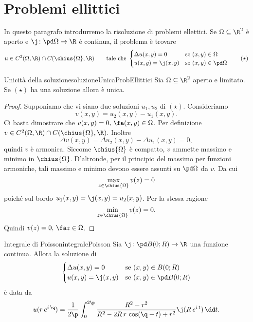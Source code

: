 \section{Problemi ellittici}

In questo paragrafo introdurremo la risoluzione di problemi ellettici. Se \(\Omega \subseteq \R^2\) è aperto e \(\j\colon \pd\Omega \to \R\) è continua, il problema è trovare
\begin{equation*}
	u\in C^2(\Omega,\R)\cap C(\chius{\Omega},\R) \qquad\text{tale che } \begin{cases}
		\Delta u(x,y) = 0 & \text{se }(x,y)\in\Omega     \\
		u(x,y) = \j(x,y)  & \text{se }(x,y)\in\pd\Omega
	\end{cases}\tag{\(\star\)}
\end{equation*}

\begin{teor}{Unicità della soluzione}{soluzioneUnicaProbEllittici}
	Sia \(\Omega\subseteq\R^2\) aperto e limitato. Se \((\star)\) ha una soluzione allora è unica.
\end{teor}

\begin{proof}
	Supponiamo che vi siano due soluzioni \(u_1,u_2\) di \((\star)\). Consideriamo
	\[
		v(x,y) = u_2(x,y) - u_1(x,y).
	\]
	Ci basta dimostrare che \(v(x,y) = 0,\,\fa (x,y)\in\Omega\).
	Per definizione \(v\in C^2(\Omega,\R)\cap C(\chius{\Omega},\R)\). Inoltre
	\[
		\Delta v(x,y) = \Delta u_2(x,y) - \Delta u_1(x,y) = 0,
	\]
	quindi \(v\) è armonica.
	Siccome \(\chius{\Omega}\) è compatto, \(v\) ammette massimo e minimo in \(\chius{\Omega}\). D'altronde, per il principio del massimo per funzioni armoniche, tali massimo e minimo devono essere assunti su \(\pd\Omega\) da \(v\). Da cui
	\[
		\max_{z\in\chius{\Omega}} v(z) = 0
	\]
	poiché sul bordo \(u_1(x,y) = \j(x,y) = u_2(x,y)\).
	Per la stessa ragione
	\[
		\min_{z\in\chius{\Omega}} v(z) = 0.
	\]
	Quindi \(v(z)=0,\,\fa z\in \Omega\).
\end{proof}

\begin{teor}{Integrale di Poisson}{integralePoisson}
	Sia \(\j\colon \pd B(0;R) \to \R\) una funzione continua.
	Allora la soluzione di
	\[
		\begin{cases}
			\Delta u(x,y) = 0 & \text{se }(x,y)\in B(0;R)      \\
			u(x,y) = \j(x,y)  & \text{se }(x,y)\in \pd B(0;R)
		\end{cases}
	\]
	è data da
	\[
		u(r\,e^{i\,\q}) = \frac{1}{2\p} \int_0^{2\p} \frac{R^2-r^2}{R^2-2R\,r\,\cos(\q-t)+r^2}\j(R\,e^{i\,t})\,\dd t.
	\]
\end{teor}

